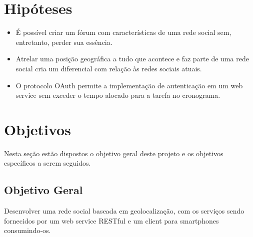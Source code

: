 \documentclass[diss]{template/setrem}
\begin{document}


\section{Hipóteses}
\begin{itemize}
  \item É possível criar um fórum com características de uma rede social sem, entretanto, perder sua essência.
  \item Atrelar uma posição geográfica a tudo que acontece e faz parte de uma rede social cria um diferencial com relação às redes sociais atuais.
  \item O protocolo OAuth permite a implementação de autenticação em um web service sem exceder o tempo alocado para a tarefa no cronograma.
\end{itemize}


\section{Objetivos}
Nesta seção estão dispostos o objetivo geral deste projeto e os objetivos específicos a serem seguidos.

\subsection{Objetivo Geral}
Desenvolver uma rede social baseada em geolocalização, com os serviços sendo fornecidos por um web service RESTful e um client para smartphones consumindo-os.
\end{document}

